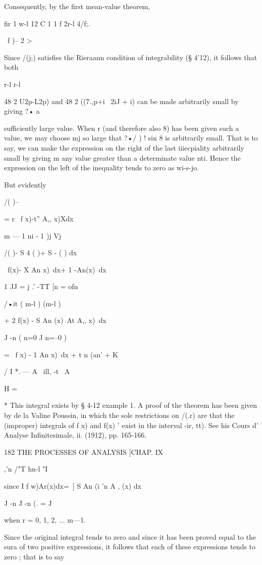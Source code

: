 Consequently, by the first mean-value theorem,

fir 1 w-l 12 C 1 1 f 2r-l 4/f;. \

\ f )-- 2 >%

Since /(j;) satisfies the Rieraann condition of integrability (§
4'12), it follows that both

r-l r-l

48 2 U2p-L2p) and 48 2 ((7.,p+i~ 2iJ + i) can be made arbitrarily
small by giving ?• a

sufficiently large value. When r (and therefore also 8) has been given
such a value, we may choose mj so large that ?•/ ) ! sin 8 is
arbitrarily small. That is to say, we can make the expression on the
right of the last iiiecpiality arbitrarily small by giving m any value
greater than a determinate value nti. Hence the expression on the left
of the inequality tends to zero as wi-s-jo.

But evidently

/( )-- %

= r \ f x)-t'' A,, x)Xdx

m — 1 ni - 1 )j Vj

/( )- S 4 ( )+ S - ( ) dx

\ f(x)- X An x)\ dx+ 1 -An(x)\ dx

1 JJ = j .' -TT [n = ofn

/•it ( m-l ) (m-l )

+ 2 f(x) - S An (x)\ At A,, x)\ dx

J -n ( n=0 J n=--0 )

= \ f x) - 1 An x)\ dx + t n (an' + K

/ I *. — A \ ill, -t \ A

H =

* This integral exists by § 4-12 example 1. A proof of the theorem has
been given by de la Valine Poussin, in which the sole restrictions on
/(.r) are that the (improper) integrals of f x) and f(x) ' exist in
the interval -ir, tt). See his Cours d' Analyse Infinitesimale, ii.
(1912), pp. 165-166.

182 THE PROCESSES OF ANALYSIS [CHAP. IX

,'n /"T hn-l "I

since I f w)Ar(x)dx=\ ] S An (i 'n A , (x) dx

J -n J -n (. = J

when r = 0, 1, 2, ... m—1.

Since the original integral tends to zero and since it has been proved
equal to the sura of two positive expressions, it follows that each of
these expressions tends to zero ; that is to say

